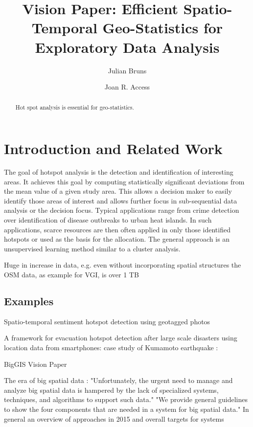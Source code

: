 \documentclass[a4paper,UKenglish]{lipics-v2016}
\title{Vision Paper: Efficient Spatio-Temporal Geo-Statistics for Exploratory Data Analysis}
\author[1]{Julian Bruns}
\author[1]{Joan R. Access}
\affil[1]{GIScience Research Group, Institute of Geography, Heidelberg University, Heidelberg, Germany\\
  \texttt{firstname.lastname@uni-heidelberg.de}}
\begin{document}
\maketitle



\begin{abstract}
Hot spot analysis is essential for geo-statistics.

\end{abstract}


\section{Introduction and Related Work}
The goal of hotspot analysis is the detection and identification of interesting areas. It achieves this goal by computing statistically significant deviations from the mean value of a given study area. This allows a decision maker to easily identify those areas of interest and allows further focus in sub-sequential data analysis or the decision focus. Typical applications range from crime detection over identification of disease outbreaks to urban heat islands. In such applications, scarce resources are then often applied in only those identified hotspots or used as the basis for the allocation. The general approach is an unsupervised learning method similar to a cluster analysis. 

Huge in increase in data, e.g. even without incorporating spatial structures the OSM\cite{OpenStreetMap} data, as example for VGI, is over 1 TB


\subsection{Examples}


Spatio-temporal sentiment hotspot detection using geotagged photos \cite{Zhu:2016:SSH:2996913.2996978}

A framework for evacuation hotspot detection after large scale disasters using location data from smartphones: case study of Kumamoto earthquake \cite {Yabe:2016:FEH:2996913.2997014} :



\cite{Wiener:2016:BCR:2996913.2996931} BigGIS Vision Paper

\cite{7129542} The era of big spatial data : 
"Unfortunately, the urgent need to manage and analyze big
spatial data is hampered by the lack of specialized systems,
techniques, and algorithms to support such data." "We
provide general guidelines to show the four components that
are needed in a system for big spatial data." 
In general an overview of approaches in 2015 and overall targets for systems
\end{document}
